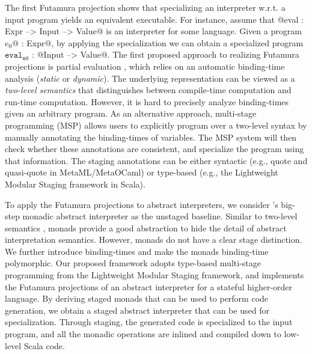 The first Futamura projection shows that specializing an
interpreter w.r.t. a input program yields an equivalent executable. For
instance, assume that @eval : Expr --> Input --> Value@ is an interpreter for some language.
Given a program $e_0$@ : Expr@, by applying the specialization we can
obtain a specialized program $\texttt{eval}_{\texttt{e0}}$ : @Input --> Value@.
The first proposed approach to realizing Futamura projections is partial
evaluation \cite{DBLP:books/daglib/0072559}, which relies on an automatic
binding-time analysis (\textit{static} or \textit{dynamic}).  The underlying
representation can be viewed as a \textit{two-level semantics}
\cite{NIELSON1989117, NIELSON198859} that distinguishes between compile-time
computation and run-time computation.
However, it is hard to precisely analyze binding-times given an arbitrary
program. As an alternative approach, multi-stage programming (MSP)
\cite{taha1999multi, DBLP:conf/pepm/TahaS97} allows users to explicitly program
over a two-level syntax \cite{Nielson:1992:TFL:130665} by manually annotating
the binding-times of variables. The MSP system will then check whether these
annotations are consistent, and specialize the program using that information.
The staging annotations can be either syntactic (e.g., quote and quasi-quote in
MetaML/MetaOCaml) or type-based (e.g., the Lightweight Modular Staging framework
\cite{DBLP:conf/gpce/RompfO10} in Scala).

To apply the Futamura projections to abstract interpreters, we consider
\citet{DBLP:journals/pacmpl/DaraisLNH17}'s big-step monadic abstract interpreter
as the unstaged baseline.  Similar to two-level semantics \cite{NIELSON1989117},
monads provide a good abstraction to hide the detail of abstract interpretation
semantics. However, monads do not have a clear stage distinction. We further
introduce binding-times and make the monads binding-time polymorphic. Our
proposed framework adopts type-based multi-stage programming from the
Lightweight Modular Staging framework, and implements the Futamura projections of
an abstract interpreter for a stateful higher-order language. By deriving staged
monads that can be used to perform code generation, we obtain a staged abstract
interpreter that can be used for specialization. Through staging, the generated
code is specialized to the input program, and all the monadic operations are
inlined and compiled down to low-level Scala code.

